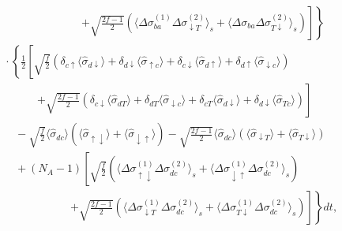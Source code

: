 \documentclass[preprint,aps,pra,onecolumn,superscriptaddress]{revtex4-1} %
\newcommand{\nn}{\nonumber}
\newcommand{\expect}[1]{\big\langle #1 \big\rangle}
\begin{document}
\begin{appendix}
\begin{align}
&\quad\quad\quad\quad\quad\quad\quad\quad\left.\left. + \sqrt{\frac{2f\!-\! 1}{2}}\left(\expect{\Delta \sigma^{(1)}_{ba}\Delta \sigma_{\downarrow T}^{(2)}}_s \!+\! \expect{\Delta\sigma_{ba}\Delta\sigma_{T\downarrow}^{(2)}}_s\right)\right]  \right\}\nn\\
&\quad\cdot\left\{ \frac{1}{2}\left[ \sqrt{\frac{f}{2}}\left(\delta_{c\uparrow}\expect{\hat{\sigma}_{d\downarrow}}+ \delta_{d\downarrow}\expect{\hat{\sigma}_{\uparrow c}}+\delta_{c\downarrow}\expect{\hat{\sigma}_{d\uparrow}} +\delta_{d\uparrow}\expect{\hat{\sigma}_{\downarrow c} } \right)\right.\right.\nn\\
&\quad\quad\quad\quad\left. +\sqrt{\frac{2f-1}{2}}\left(\delta_{c\downarrow}\expect{\hat{\sigma}_{dT}} + \delta_{dT}\expect{\hat{\sigma}_{\downarrow c} }+\delta_{cT}\expect{\hat{\sigma}_{d\downarrow} } +\delta_{d\downarrow}\expect{\hat{\sigma}_{Tc} } \right)\right] \nn\\
&\quad\quad -\sqrt{\frac{f}{2}}\expect{\hat{\sigma}_{dc} }\left(\expect{\hat{\sigma}_{\uparrow\downarrow} }+\expect{\hat{\sigma}_{\downarrow\uparrow} } \right) -\sqrt{\frac{2f-1}{2}} \expect{\hat{\sigma}_{dc}}\left(\expect{\hat{\sigma}_{\downarrow T}}+\expect{\hat{\sigma}_{T\downarrow}} \right)\nn\\
&\quad\quad + (N_A-1)\left[ \sqrt{\frac{f}{2}} \left(\expect{\Delta\sigma_{\uparrow\downarrow}^{(1)}\Delta\sigma_{dc}^{(2)}}_s \!+\!\expect{\Delta\sigma_{\downarrow\uparrow}^{(1)}\Delta \sigma_{dc}^{(2)}}_s\right)\right. \nn\\
&\quad\quad\quad\quad\quad\quad\quad\left.\left. + \sqrt{\frac{2f\!-\! 1}{2}}\left(\expect{\!\Delta \sigma_{\downarrow T}^{(\!1\!)}\Delta\sigma_{dc}^{(\!2\!)}}_s \!+\!\expect{\!\Delta\sigma_{T\downarrow}^{(\! 1\! )} \Delta \sigma_{dc}^{(\!2\!)} }_s\right)\!\right]\!  \right\}dt,\label{eq:dsigmabadc_QND_expand}
\end{align}

\end{appendix}
\end{document}
